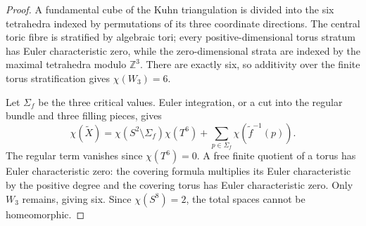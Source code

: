 
\begin{proof}
A fundamental cube of the Kuhn triangulation is divided into the six
tetrahedra indexed by permutations of its three coordinate directions.
The central toric fibre is stratified by algebraic tori; every
positive-dimensional torus stratum has Euler characteristic zero, while
the zero-dimensional strata are indexed by the maximal tetrahedra modulo
$\mathbb Z^3$.  There are exactly six, so additivity over the finite torus
stratification gives $\chi(W_3)=6$.

Let $\Sigma_f$ be the three critical values.  Euler integration, or a cut
into the regular bundle and three filling pieces, gives
\[
 \chi(\widetilde X)
 =\chi(S^2\setminus\Sigma_f)\chi(T^6)
  +\sum_{p\in\Sigma_f}\chi(\widetilde f^{-1}(p)).
\]
The regular term vanishes since $\chi(T^6)=0$.  A free finite quotient of a
torus has Euler characteristic zero: the covering formula multiplies its
Euler characteristic by the positive degree and the covering torus has
Euler characteristic zero.  Only $W_3$ remains, giving six.  Since
$\chi(S^8)=2$, the total spaces cannot be homeomorphic.
\end{proof}


